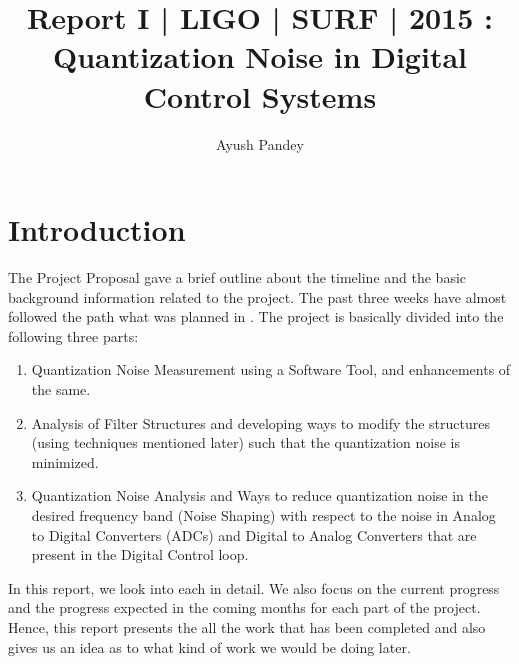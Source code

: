 \documentclass[colorlinks=true,pdfstartview=FitV,linkcolor=blue,
            citecolor=red,urlcolor=magenta]{ligodoc}
\title{Report I | LIGO | SURF | 2015 : Quantization Noise in Digital Control Systems}
\author{Ayush Pandey}
\begin{document}
\section{Introduction}

The Project Proposal\cite{ProjectProposal} gave a brief outline about the timeline and the basic background information related to the project. The past three weeks have almost followed the path what was planned in \cite{ProjectProposal}. The project is basically divided into the following three parts: \\
\begin{enumerate}
\item Quantization Noise Measurement using a Software Tool, and enhancements of the same.
\item Analysis of Filter Structures and developing ways to modify the structures (using techniques mentioned later) such that the quantization noise is minimized.
\item Quantization Noise Analysis and Ways to reduce quantization noise in the desired frequency band (Noise Shaping) with respect to the noise in Analog to Digital Converters (ADCs) and Digital to Analog Converters that are present in the Digital Control loop.  

\end{enumerate}

In this report, we look into each in detail. We also focus on the current progress and the progress expected in the coming months for each part of the project. Hence, this report presents the all the work that has been completed and also gives us an idea as to what kind of work we would be doing later.
\end{document}
